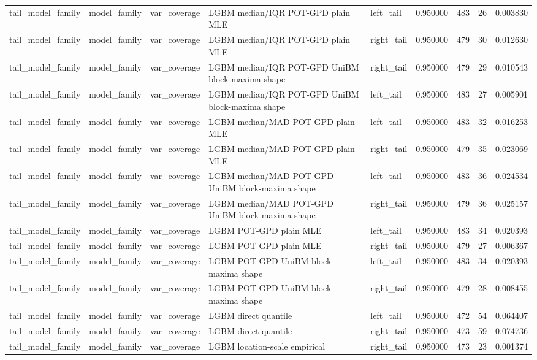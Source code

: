 \begin{tabular}{lllllrrr}
tail\_model\_family & model\_family & var\_coverage & LGBM median/IQR POT-GPD plain MLE & left\_tail & 0.950000 & 483 & 26 & 0.003830 \\
tail\_model\_family & model\_family & var\_coverage & LGBM median/IQR POT-GPD plain MLE & right\_tail & 0.950000 & 479 & 30 & 0.012630 \\
tail\_model\_family & model\_family & var\_coverage & LGBM median/IQR POT-GPD UniBM block-maxima shape & right\_tail & 0.950000 & 479 & 29 & 0.010543 \\
tail\_model\_family & model\_family & var\_coverage & LGBM median/IQR POT-GPD UniBM block-maxima shape & left\_tail & 0.950000 & 483 & 27 & 0.005901 \\
tail\_model\_family & model\_family & var\_coverage & LGBM median/MAD POT-GPD plain MLE & left\_tail & 0.950000 & 483 & 32 & 0.016253 \\
tail\_model\_family & model\_family & var\_coverage & LGBM median/MAD POT-GPD plain MLE & right\_tail & 0.950000 & 479 & 35 & 0.023069 \\
tail\_model\_family & model\_family & var\_coverage & LGBM median/MAD POT-GPD UniBM block-maxima shape & left\_tail & 0.950000 & 483 & 36 & 0.024534 \\
tail\_model\_family & model\_family & var\_coverage & LGBM median/MAD POT-GPD UniBM block-maxima shape & right\_tail & 0.950000 & 479 & 36 & 0.025157 \\
tail\_model\_family & model\_family & var\_coverage & LGBM POT-GPD plain MLE & left\_tail & 0.950000 & 483 & 34 & 0.020393 \\
tail\_model\_family & model\_family & var\_coverage & LGBM POT-GPD plain MLE & right\_tail & 0.950000 & 479 & 27 & 0.006367 \\
tail\_model\_family & model\_family & var\_coverage & LGBM POT-GPD UniBM block-maxima shape & left\_tail & 0.950000 & 483 & 34 & 0.020393 \\
tail\_model\_family & model\_family & var\_coverage & LGBM POT-GPD UniBM block-maxima shape & right\_tail & 0.950000 & 479 & 28 & 0.008455 \\
tail\_model\_family & model\_family & var\_coverage & LGBM direct quantile & left\_tail & 0.950000 & 472 & 54 & 0.064407 \\
tail\_model\_family & model\_family & var\_coverage & LGBM direct quantile & right\_tail & 0.950000 & 473 & 59 & 0.074736 \\
tail\_model\_family & model\_family & var\_coverage & LGBM location-scale empirical & right\_tail & 0.950000 & 473 & 23 & 0.001374 \\

\end{tabular}
